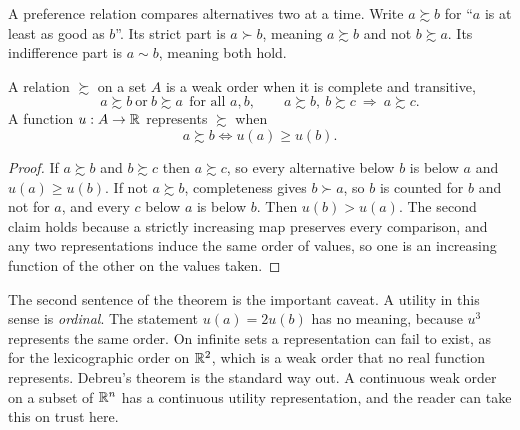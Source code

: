 A preference relation compares alternatives two at a time. Write $a\succsim b$ for ``$a$ is at least as good as $b$''. Its strict part is $a\succ b$, meaning $a\succsim b$ and not $b\succsim a$. Its indifference part is $a\sim b$, meaning both hold.

\begin{definition}\label{def:ch08:weakorder}
A relation $\succsim$ on a set $A$ is a weak order when it is complete and transitive,
\begin{equation}\label{eq:ch08:weakorder}
a\succsim b\ \text{or}\ b\succsim a\ \ \text{for all }a,b,\qquad a\succsim b,\ b\succsim c\ \Rightarrow\ a\succsim c .
\end{equation}
A function $u:A\to\mathbb{R}$ represents $\succsim$ when
\begin{equation}\label{eq:ch08:represent}
a\succsim b\iff u(a)\ge u(b).
\end{equation}
\end{definition}


\begin{proof}
If $a\succsim b$ and $b\succsim c$ then $a\succsim c$, so every alternative below $b$ is below $a$ and $u(a)\ge u(b)$. If not $a\succsim b$, completeness gives $b\succ a$, so $b$ is counted for $b$ and not for $a$, and every $c$ below $a$ is below $b$. Then $u(b)>u(a)$. The second claim holds because a strictly increasing map preserves every comparison, and any two representations induce the same order of values, so one is an increasing function of the other on the values taken.
\end{proof}

The second sentence of the theorem is the important caveat. A utility in this sense is \emph{ordinal}. The statement $u(a)=2u(b)$ has no meaning, because $u^3$ represents the same order. On infinite sets a representation can fail to exist, as for the lexicographic order on $\mathbb{R}^2$, which is a weak order that no real function represents. Debreu's theorem is the standard way out. A continuous weak order on a subset of $\mathbb{R}^n$ has a continuous utility representation, and the reader can take this on trust here.

